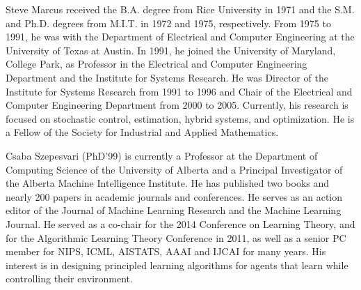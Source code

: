 \documentclass[twocolumn]{IEEEtran}
\begin{document}

\begin{IEEEbiographynophoto}{Steve Marcus}
received the B.A. degree from Rice University in 1971 and the S.M. and Ph.D. degrees from M.I.T. in 1972 and 1975, respectively.  From 1975 to 1991, he was with the Department of Electrical and Computer Engineering at the University of Texas at Austin.  In 1991, he joined the University of Maryland, College Park, as Professor in the Electrical and Computer Engineering Department and the Institute for Systems Research.  He was Director of the Institute for Systems Research from 1991 to 1996 and Chair of the Electrical and Computer Engineering Department from 2000 to 2005.  Currently, his research is focused on stochastic control, estimation, hybrid systems, and optimization.  He is a Fellow of the Society for Industrial and Applied Mathematics.
\end{IEEEbiographynophoto}


\begin{IEEEbiographynophoto}{Csaba Szepesvari}
(PhD'99) is currently a Professor at the Department of
Computing Science of the University of Alberta and a Principal
Investigator of the Alberta Machine Intelligence Institute. He has published two books and nearly 200 papers in academic
journals and conferences. 
He serves as an action editor of the Journal of Machine
Learning Research and the Machine Learning Journal. He served as a
co-chair for the 2014 Conference on Learning Theory, and for the
Algorithmic Learning Theory Conference in 2011, as well as a senior PC
member for NIPS, ICML, AISTATS, AAAI and IJCAI for many years. His
interest is in designing principled learning algorithms for agents that
learn while controlling their environment.
\end{IEEEbiographynophoto}
\end{document}
